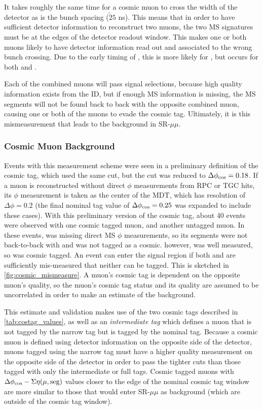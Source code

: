 It takes roughly the same time for a cosmic muon to cross the width of the detector as is the bunch spacing ($\tilde 25$ ns). This means that in order to have sufficient detector information to reconstruct two muons, the two \ac{MS} signatures must be at the edges of the detector readout window. This makes one or both muons likely to have detector information read out and associated to the wrong bunch crossing. Due to the early timing of \mt, this is more likely for \mt, but occurs for both \mt and \mb. 

Each of the combined muons will pass signal selections, because high quality information exists from the \ac{ID}, but if enough \ac{MS} information is missing, the \ac{MS} segments will not be found back to back with the opposite combined muon, causing one or both of the muons to evade the cosmic tag. Ultimately, it is this mismeasurement that leads to the background in SR-$\mu\mu$. 



\subsubsection{Cosmic Muon Background}

Events with this measurement scheme were seen in a preliminary definition of the cosmic tag, which used the same \sigeta cut, but the \dphicos cut was reduced to $\Delta \phi_{\text{cos}} = 0.18$. If a muon is reconstructed without direct $\phi$ measurements from \ac{RPC} or \ac{TGC} hits, its $\phi$ measurement is taken as the center of the \ac{MDT}, which has resolution of $\Delta \phi = 0.2$ (the final nominal tag value of $\Delta \phi_{\text{cos}} = 0.25$ was expanded to include these cases). With this preliminary version of the cosmic tag, about 40 events were observed with one cosmic tagged muon, and another untagged muon. In these events, \mt was missing direct \ac{MS} $\phi$ measurements, so its segments were not back-to-back with \mb and \mb was not tagged as a cosmic. \mb however, was well measured, so \mt was cosmic tagged. An event can enter the signal region if both \mb and \mt are sufficiently mis-measured that neither can be tagged. This is sketched in \autoref{fig:cosmic_mismeasure}. A muon's cosmic tag is dependent on the opposite muon's quality, so the muon's cosmic tag status and its quality are assumed to be uncorrelated in order to make an estimate of the background.

This estimate and validation makes use of the two cosmic tags described in \autoref{tab:costag_values}, as well as an \emph{intermediate tag} which defines a muon that is not tagged by the narrow tag but is tagged by the nominal tag. Because a cosmic muon is defined using detector information on the opposite side of the detector, muons tagged using the narrow tag must have a higher quality measurement on the opposite side of the detector in order to pass the tighter cuts than those tagged with only the intermediate or full tags. Cosmic tagged muons with $\Delta \phi_{\text{cos}}-\Sigma \eta(\mu, \text{seg})$ values closer to the edge of the nominal cosmic tag window are more similar to those that would enter SR-$\mu\mu$ as background (which are outside of the cosmic tag window). 



